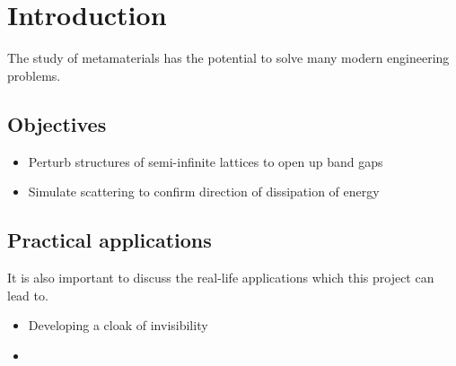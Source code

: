 \chapter{Introduction}
The study of metamaterials has the potential to solve many modern engineering
problems.

\section{Objectives}
\begin{itemize}
\item Perturb structures of semi-infinite lattices to open up band gaps
\item Simulate scattering to confirm direction of dissipation of energy
\end{itemize}

\section{Practical applications}
It is also important to discuss the real-life applications which this project
can lead to.

\begin{itemize}
\item Developing a cloak of invisibility \cite{emcloak}
\item
\end{itemize}
